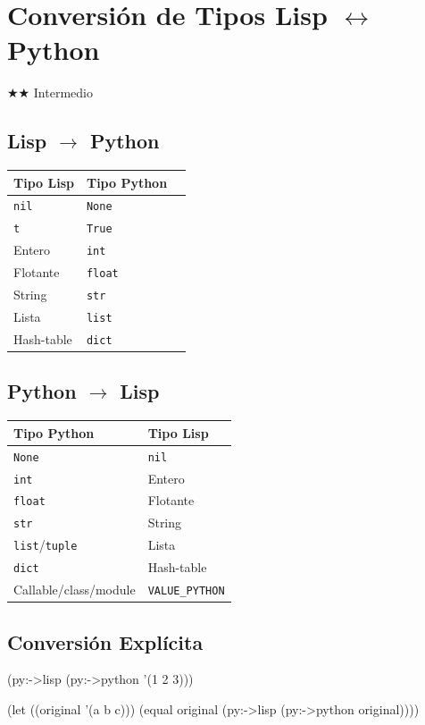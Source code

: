 \chapter{Conversión de Tipos Lisp $\leftrightarrow$ Python}
\label{chap:type-conversion}
{\huge$\bigstar$}{\huge$\bigstar$} Intermedio

\section{Lisp $\rightarrow$ Python}
\begin{center}
\begin{tabular}{lll}
\toprule
\textbf{Tipo Lisp} & \textbf{Tipo Python} \\
\midrule
\texttt{nil} & \texttt{None} \\
\texttt{t} & \texttt{True} \\
Entero & \texttt{int} \\
Flotante & \texttt{float} \\
String & \texttt{str} \\
Lista & \texttt{list} \\
Hash-table & \texttt{dict} \\
\bottomrule
\end{tabular}
\end{center}

\section{Python $\rightarrow$ Lisp}
\begin{center}
\begin{tabular}{ll}
\toprule
\textbf{Tipo Python} & \textbf{Tipo Lisp} \\
\midrule
\texttt{None} & \texttt{nil} \\
\texttt{int} & Entero \\
\texttt{float} & Flotante \\
\texttt{str} & String \\
\texttt{list}/\texttt{tuple} & Lista \\
\texttt{dict} & Hash-table \\
Callable/class/module & \texttt{VALUE\_PYTHON} \\
\bottomrule
\end{tabular}
\end{center}

\section{Conversión Explícita}
\begin{lispcode}
(py:->lisp (py:->python '(1 2 3)))
\end{lispcode}

\begin{examplebox}[title=Roundtrip Lisp $\to$ Python $\to$ Lisp]
\begin{lispcode}
(let ((original '(a b c)))
  (equal original (py:->lisp (py:->python original))))
\end{lispcode}
\end{examplebox}

